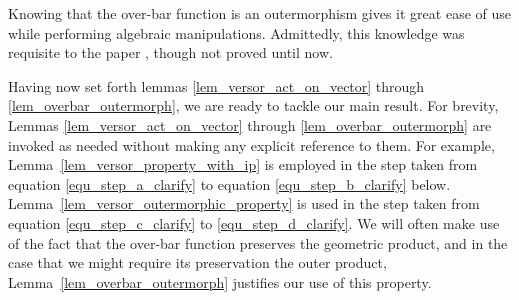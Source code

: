 \documentclass{birkjour}
\theoremstyle{definition}
\theoremstyle{remark}
\numberwithin{equation}{section}
\begin{document}
Knowing that the over-bar function is an outermorphism gives it great
ease of use while performing algebraic manipulations.  Admittedly, this knowledge
was requisite to the paper \cite{Parkin12}, though not proved until now.

Having now set forth lemmas \ref{lem_versor_act_on_vector} through
\ref{lem_overbar_outermorph},
we are ready to tackle our main result.  For brevity, Lemmas
\ref{lem_versor_act_on_vector} through
\ref{lem_overbar_outermorph} are invoked as needed
without making any explicit reference to them.
For example, 
Lemma~\ref{lem_versor_property_with_ip}
is employed in the step taken from equation
\eqref{equ_step_a_clarify} to equation \eqref{equ_step_b_clarify} below.
Lemma~\ref{lem_versor_outermorphic_property} is used in the step taken
from equation \eqref{equ_step_c_clarify}
to \eqref{equ_step_d_clarify}.  We will often make use of the fact
that the over-bar function preserves the geometric product, and in the
case that we might require its preservation the outer product,
Lemma~\ref{lem_overbar_outermorph} justifies our use of this property.
\end{document}
